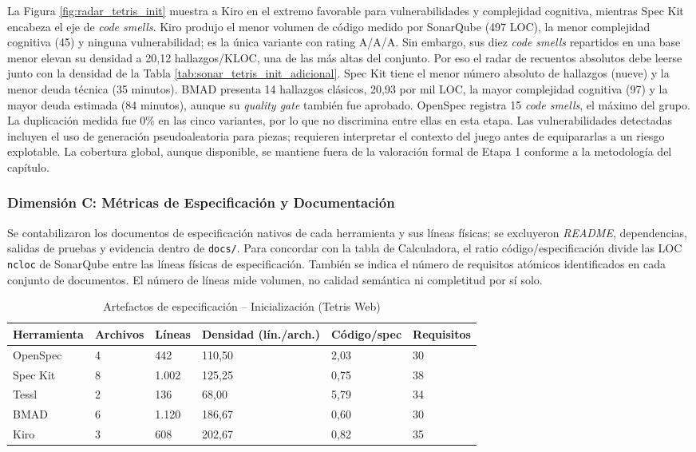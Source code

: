 La Figura \ref{fig:radar_tetris_init} muestra a Kiro en el extremo favorable para vulnerabilidades y complejidad cognitiva, mientras Spec Kit encabeza el eje de \textit{code smells}. Kiro produjo el menor volumen de código medido por SonarQube (497 LOC), la menor complejidad cognitiva (45) y ninguna vulnerabilidad; es la única variante con rating A/A/A. Sin embargo, sus diez \textit{code smells} repartidos en una base menor elevan su densidad a 20,12 hallazgos/KLOC, una de las más altas del conjunto. Por eso el radar de recuentos absolutos debe leerse junto con la densidad de la Tabla \ref{tab:sonar_tetris_init_adicional}. Spec Kit tiene el menor número absoluto de hallazgos (nueve) y la menor deuda técnica (35 minutos). BMAD presenta 14 hallazgos clásicos, 20,93 por mil LOC, la mayor complejidad cognitiva (97) y la mayor deuda estimada (84 minutos), aunque su \textit{quality gate} también fue aprobado. OpenSpec registra 15 \textit{code smells}, el máximo del grupo. La duplicación medida fue 0\% en las cinco variantes, por lo que no discrimina entre ellas en esta etapa. Las vulnerabilidades detectadas incluyen el uso de generación pseudoaleatoria para piezas; requieren interpretar el contexto del juego antes de equipararlas a un riesgo explotable. La cobertura global, aunque disponible, se mantiene fuera de la valoración formal de Etapa 1 conforme a la metodología del capítulo.

\subsubsection{Dimensión C: Métricas de Especificación y Documentación}

Se contabilizaron los documentos de especificación nativos de cada herramienta y sus líneas físicas; se excluyeron \textit{README}, dependencias, salidas de pruebas y evidencia dentro de \texttt{docs/}. Para concordar con la tabla de Calculadora, el ratio código/especificación divide las LOC \texttt{ncloc} de SonarQube entre las líneas físicas de especificación. También se indica el número de requisitos atómicos identificados en cada conjunto de documentos. El número de líneas mide volumen, no calidad semántica ni completitud por sí solo.

\begin{table}[H]
\centering
\caption{Artefactos de especificación -- Inicialización (Tetris Web)}
\label{tab:specs_tetris_init}
\begin{tabularx}{\textwidth}{l Y Y Y Y Y}
\toprule
\textbf{Herramienta} & \textbf{Archivos} & \textbf{Líneas} & \textbf{Densidad (lín./arch.)} & \textbf{Código/spec} & \textbf{Requisitos} \\
\midrule
OpenSpec & 4 & 442 & 110,50 & 2,03 & 30 \\
Spec Kit & 8 & 1.002 & 125,25 & 0,75 & 38 \\
Tessl & 2 & 136 & 68,00 & 5,79 & 34 \\
BMAD & 6 & 1.120 & 186,67 & 0,60 & 30 \\
Kiro & 3 & 608 & 202,67 & 0,82 & 35 \\
\bottomrule
\end{tabularx}
\end{table}

